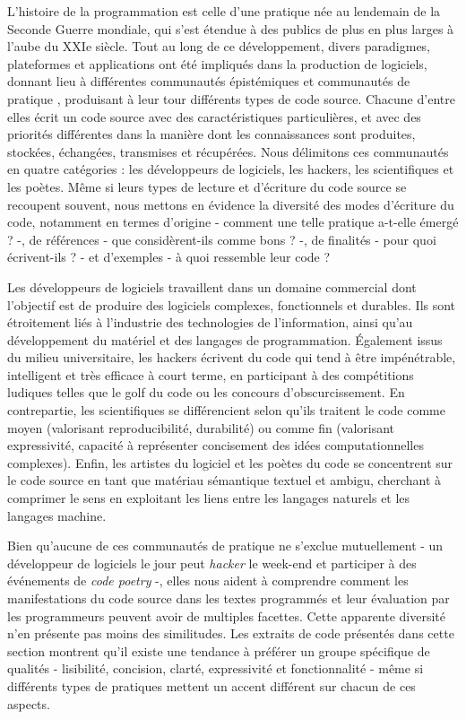 \documentclass{article}
\begin{document}
L'histoire de la programmation est celle d'une pratique née au lendemain de la Seconde Guerre mondiale, qui s'est étendue à des publics de plus en plus larges à l'aube du XXIe siècle. Tout au long de ce développement, divers paradigmes, plateformes et applications ont été impliqués dans la production de logiciels, donnant lieu à différentes communautés épistémiques \citep{cohendet_organisational_2001} et communautés de pratique \citep{hayes_cultures_2015}, produisant à leur tour différents types de code source. Chacune d'entre elles écrit un code source avec des caractéristiques particulières, et avec des priorités différentes dans la manière dont les connaissances sont produites, stockées, échangées, transmises et récupérées. Nous délimitons ces communautés en quatre catégories : les développeurs de logiciels, les hackers, les scientifiques et les poètes. Même si leurs types de lecture et d'écriture du code source se recoupent souvent, nous mettons en évidence la diversité des modes d'écriture du code, notamment en termes d'origine - comment une telle pratique a-t-elle émergé ? -, de références - que considèrent-ils comme bons ? -, de finalités - pour quoi écrivent-ils ? - et d'exemples - à quoi ressemble leur code ?

Les développeurs de logiciels travaillent dans un domaine commercial dont l'objectif est de produire des logiciels complexes, fonctionnels et durables. Ils sont étroitement liés à l'industrie des technologies de l'information, ainsi qu'au développement du matériel et des langages de programmation. Également issus du milieu universitaire, les hackers écrivent du code qui tend à être impénétrable, intelligent et très efficace à court terme, en participant à des compétitions ludiques telles que le golf du code ou les concours d'obscurcissement. En contrepartie, les scientifiques se différencient selon qu'ils traitent le code comme moyen (valorisant reproducibilité, durabilité) ou comme fin (valorisant expressivité, capacité à représenter concisement des idées computationnelles complexes). Enfin, les artistes du logiciel et les poètes du code se concentrent sur le code source en tant que matériau sémantique textuel et ambigu, cherchant à comprimer le sens en exploitant les liens entre les langages naturels et les langages machine.

Bien qu'aucune de ces communautés de pratique ne s'exclue mutuellement - un développeur de logiciels le jour peut \emph{hacker} le week-end et participer à des événements de \emph{code poetry} -, elles nous aident à comprendre comment les manifestations du code source dans les textes programmés et leur évaluation par les programmeurs peuvent avoir de multiples facettes. Cette apparente diversité n'en présente pas moins des similitudes. Les extraits de code présentés dans cette section montrent qu'il existe une tendance à préférer un groupe spécifique de qualités - lisibilité, concision, clarté, expressivité et fonctionnalité - même si différents types de pratiques mettent un accent différent sur chacun de ces aspects.
\end{document}
